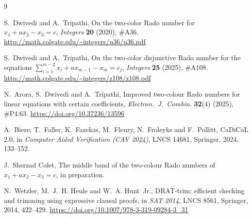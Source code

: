 \documentclass[11pt]{article}
\theoremstyle{remark}
\theoremstyle{definition}
\begin{document}
\begin{thebibliography}{9}

S.~Dwivedi and A.~Tripathi,
On the two-color Rado number for $x_1 + a x_2 - x_3 = c$,
\emph{Integers} \textbf{20} (2020), \#A36.
\url{http://math.colgate.edu/~integers/u36/u36.pdf}

S.~Dwivedi and A.~Tripathi,
On the two-color disjunctive Rado number for the equations
$\sum_{i=1}^{m-2} x_i + a x_{m-1} - x_m = c_j$,
\emph{Integers} \textbf{25} (2025), \#A108.
\url{http://math.colgate.edu/~integers/z108/z108.pdf}

N.~Arora, S.~Dwivedi and A.~Tripathi,
Improved two-colour Rado numbers for linear equations with certain
coefficients,
\emph{Electron.\ J.\ Combin.} \textbf{32}(4) (2025), \#P4.63.
\url{https://doi.org/10.37236/13596}

A.~Biere, T.~Faller, K.~Fazekas, M.~Fleury, N.~Froleyks and F.~Pollitt,
CaDiCaL 2.0,
in \emph{Computer Aided Verification (CAV 2024)}, LNCS 14681, Springer,
2024, 133--152.

J.~Sherzad Colet,
The middle band of the two-colour Rado numbers of $x_1 + a x_2 - x_3 = c$,
in preparation.

N.~Wetzler, M.~J.~H. Heule and W.~A. Hunt~Jr.,
DRAT-trim: efficient checking and trimming using expressive clausal proofs,
in \emph{SAT 2014}, LNCS 8561, Springer, 2014, 422--429.
\url{https://doi.org/10.1007/978-3-319-09284-3_31}

\end{thebibliography}
\end{document}
